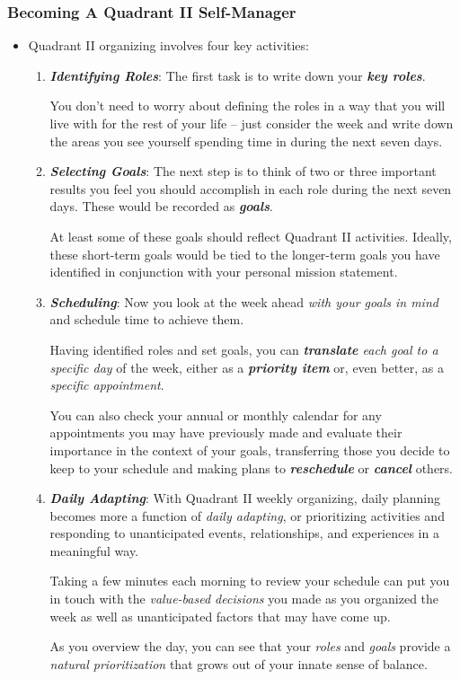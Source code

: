 \documentclass[11pt]{article}
\begin{document}
\subsubsection{Becoming A Quadrant II Self-Manager}
\begin{itemize}
\item Quadrant II organizing involves four key activities:
\begin{enumerate}
\item \textbf{\emph{Identifying Roles}}: The first task is to write down your \emph{\textbf{key roles}}. 

You don't need to worry about defining the roles in a way that you will live with for the rest of your life -- just consider the week and write down the areas you see yourself spending time in during the next seven days.

\item \textbf{\emph{Selecting Goals}}: The next step is to think of two or three important results you feel you should accomplish in each role during the next seven days. These would be recorded as \emph{\textbf{goals}}.

At least some of these goals should reflect Quadrant II activities. Ideally, these short-term goals
would be tied to the longer-term goals you have identified in conjunction with your personal mission
statement.

\item \textbf{\emph{Scheduling}}: Now you look at the week ahead \emph{with your goals in mind} and schedule time to achieve them.

Having identified roles and set goals, you can \emph{\textbf{translate} each goal to a specific day} of the week, either as a \emph{\textbf{priority item}} or, even better, as a \emph{specific appointment}. 

You can also check your annual or monthly calendar for any appointments you may have previously made and evaluate their importance in the context of your goals, transferring those you decide to keep to your schedule and making plans to \emph{\textbf{reschedule}} or \emph{\textbf{cancel}} others.

\item \textbf{\emph{Daily Adapting}}: With Quadrant II weekly organizing, daily planning becomes more a function of \emph{daily adapting}, or prioritizing activities and responding to unanticipated events, relationships, and experiences in a meaningful way.

Taking a few minutes each morning to review your schedule can put you in touch with the \emph{value-based decisions} you made as you organized the week as well as unanticipated factors that may have come up.  

As you overview the day, you can see that your \emph{roles} and \emph{goals} provide a \emph{natural prioritization} that grows out of your innate sense of balance. 
\end{enumerate}
\end{itemize}
\end{document}
